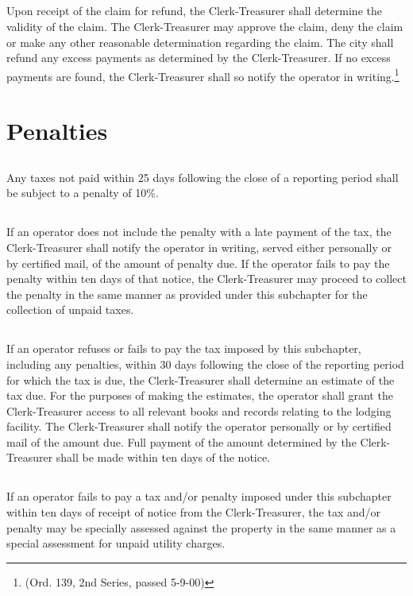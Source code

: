 \subsection{}
Upon receipt of the claim for refund, the Clerk-Treasurer shall determine the validity of the claim. The Clerk-Treasurer may approve the claim, deny the claim or make any other reasonable determination regarding the claim. The city shall refund any excess payments as determined by the Clerk-Treasurer. If no excess payments are found, the Clerk-Treasurer shall so notify the operator in writing.\footnote{(Ord. 139, 2nd Series, passed 5-9-00)}

\section{Penalties}
\subsection{}
Any taxes not paid within 25 days following the close of a reporting period shall be subject to a penalty of 10\%.
\subsection{}
If an operator does not include the penalty with a late payment of the tax, the Clerk-Treasurer shall notify the operator in writing, served either personally or by certified mail, of the amount of penalty due. If the operator fails to pay the penalty within ten days of that notice, the Clerk-Treasurer may proceed to collect the penalty in the same manner as provided under this subchapter for the collection of unpaid taxes.
\subsection{}
If an operator refuses or fails to pay the tax imposed by this subchapter, including any penalties, within 30 days following the close of the reporting period for which the tax is due, the Clerk-Treasurer shall determine an estimate of the tax due. For the purposes of making the estimates, the operator shall grant the Clerk-Treasurer access to all relevant books and records relating to the lodging facility. The Clerk-Treasurer shall notify the operator personally or by certified mail of the amount due. Full payment of the amount determined by the Clerk-Treasurer shall be made within ten days of the notice.
\subsection{}
If an operator fails to pay a tax and/or penalty imposed under this subchapter within ten days of receipt of notice from the Clerk-Treasurer, the tax and/or penalty may be specially assessed against the property in the same manner as a special assessment for unpaid utility charges.
